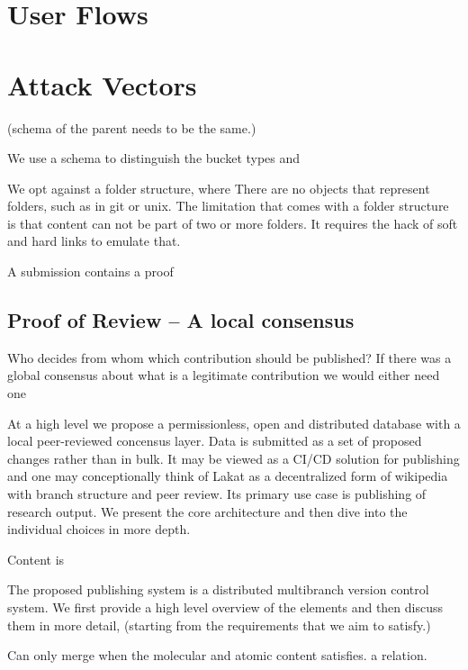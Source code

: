 \documentclass[14pt]{article}
\newcommand{\remark}[1]{{\color{purple} (#1)}}
\begin{document}
\section{User Flows}

\section{Attack Vectors}

\remark{schema of the parent needs to be the same.}

We use a schema to distinguish the bucket types and  

We opt against a folder structure, where
There are no objects that represent folders, such as in git or unix. The limitation that comes with a folder structure is that content can not be part of two or more folders. It requires the hack of soft and hard links to emulate that.





A submission contains a proof 



\subsection{Proof of Review -- A local consensus}

Who decides from whom which contribution should be published? If there was a global consensus about what is a legitimate contribution we would either need one 


At a high level we propose a permissionless, open and distributed database with a local peer-reviewed concensus layer. Data is submitted as a set of proposed changes rather than in bulk. It may be viewed as a CI/CD solution for publishing and one may conceptionally think of Lakat as a decentralized form of wikipedia with branch structure and peer review. Its primary use case is publishing of research output. We present the core architecture and then dive into the individual choices in more depth. 



Content is 



The proposed publishing system is a distributed multibranch version control system. We first provide a high level overview of the elements and then discuss them in more detail, \remark{starting from the requirements that we aim to satisfy.}


Can only merge when the molecular and atomic content satisfies. a relation. 
\end{document}
